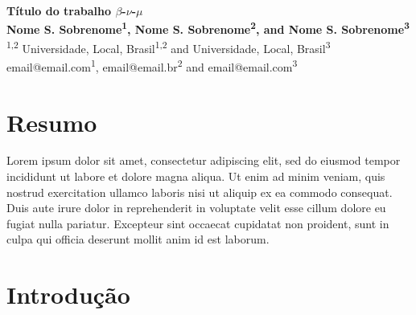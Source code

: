 \documentclass[a0,portrait]{a0poster}
\begin{document}
\begin{mdframed}[style=MyFrame]
\vspace{3cm}
\begin{minipage}[h]{0.98\linewidth}
\centering \huge \color{SteelBlue} \textbf{Título do trabalho $\beta$-$\nu$-$\mu$} \color{Black}\\ %
\Large \textbf{Nome S. Sobrenome\textsuperscript{1}, Nome S. Sobrenome\textsuperscript{2}, and Nome S. Sobrenome\textsuperscript{3}}\\ %
\normalsize \textsuperscript{1,2} Universidade, Local, Brasil\textsuperscript{1,2} and Universidade, Local, Brasil\textsuperscript{3}\\ %
email@email.com\textsuperscript{1}, email@email.br\textsuperscript{2} and email@email.com\textsuperscript{3}\\
\end{minipage}
\vspace{0.5cm} %


\begin{multicols}{2} %



\section{Resumo}
Lorem ipsum dolor sit amet, consectetur adipiscing elit, sed do eiusmod tempor incididunt ut labore et dolore magna aliqua. Ut enim ad minim veniam, quis nostrud exercitation ullamco laboris nisi ut aliquip ex ea commodo consequat. Duis aute irure dolor in reprehenderit in voluptate velit esse cillum dolore eu fugiat nulla pariatur. Excepteur sint occaecat cupidatat non proident, sunt in culpa qui officia deserunt mollit anim id est laborum.


\section{Introdução}\label{section:1}


\end{multicols}
\end{mdframed}
\end{document}
